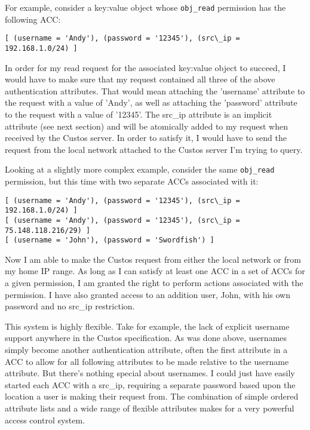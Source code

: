 For example, consider a key:value object whose \texttt{obj\_read}
permission has the following ACC:

\begin{verbatim}
[ (username = 'Andy'), (password = '12345'), (src\_ip = 192.168.1.0/24) ]
\end{verbatim}

In order for my read request for the associated key:value object to
succeed, I would have to make sure that my request contained all three
of the above authentication attributes. That would mean attaching the
'username' attribute to the request with a value of 'Andy', as well as
attaching the 'password' attribute to the request with a value of
'12345'. The src\_ip attribute is an implicit attribute (see next
section) and will be atomically added to my request when received by
the Custos server. In order to satisfy it, I would have to send the
request from the local network attached to the Custos server I'm
trying to query.

Looking at a slightly more complex example, consider the same
\texttt{obj\_read} permission, but this time with two separate ACCs
associated with it:

\begin{verbatim}
[ (username = 'Andy'), (password = '12345'), (src\_ip = 192.168.1.0/24) ]
[ (username = 'Andy'), (password = '12345'), (src\_ip = 75.148.118.216/29) ]
[ (username = 'John'), (password = 'Swordfish') ]
\end{verbatim}

Now I am able to make the Custos request from either the local network
or from my home IP range. As long as I can satisfy at least one ACC in
a set of ACCs for a given permission, I am granted the right to
perform actions associated with the permission. I have also granted
access to an addition user, John, with his own password and no src\_ip
restriction.

This system is highly flexible. Take for example, the lack of explicit
username support anywhere in the Custos specification. As was done
above, usernames simply become another authentication attribute, often
the first attribute in a ACC to allow for all following attributes to
be made relative to the username attribute. But there's nothing
special about usernames. I could just have easily started each ACC
with a src\_ip, requiring a separate password based upon the location
a user is making their request from. The combination of simple ordered
attribute lists and a wide range of flexible attributes makes for a
very powerful access control system.


